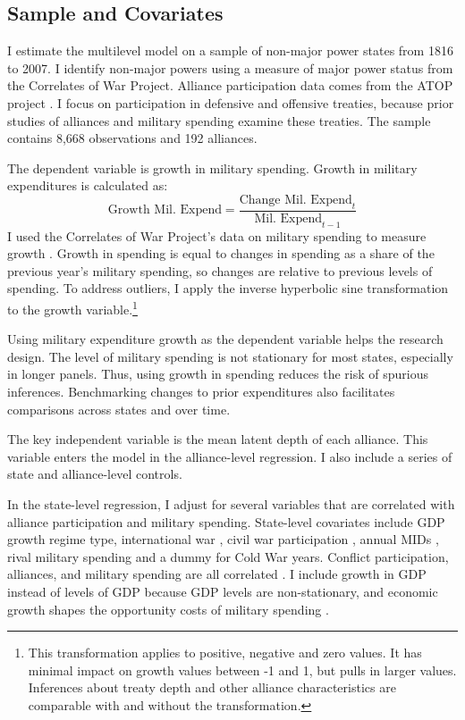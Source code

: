 \documentclass[12pt]{article}
\begin{document}
\subsection{Sample and Covariates} 

I estimate the multilevel model on a sample of non-major power states from 1816 to 2007. 
I identify non-major powers using a measure of major power status from the Correlates of War Project. 
Alliance participation data comes from the ATOP project \citep{Leedsetal2002}.  
I focus on participation in defensive and offensive treaties, because prior studies of alliances and military spending examine these treaties. 
The sample contains 8,668 observations and 192 alliances. 


The dependent variable is growth in military spending.
Growth in military expenditures is calculated as:
\begin{equation}
\mbox{Growth Mil. Expend} = \frac{ \mbox{Change Mil. Expend}_t }{ \mbox{Mil. Expend}_{t-1} }
\end{equation} 
I used the Correlates of War Project's data on military spending to measure growth \citep{SingerCINC1988}. 
Growth in spending is equal to changes in spending as a share of the previous year's military spending, so changes are relative to previous levels of spending. 
To address outliers, I apply the inverse hyperbolic sine transformation to the growth variable.\footnote{This transformation applies to positive, negative and zero values. It has minimal impact on growth values between -1 and 1, but pulls in larger values. Inferences about treaty depth and other alliance characteristics are comparable with and without the transformation.}


Using military expenditure growth as the dependent variable helps the research design. 
The level of military spending is not stationary for most states, especially in longer panels. 
Thus, using growth in spending reduces the risk of spurious inferences.
Benchmarking changes to prior expenditures also facilitates comparisons across states and over time. 


The key independent variable is the mean latent depth of each alliance. 
This variable enters the model in the alliance-level regression. 
I also include a series of state and alliance-level controls. 


In the state-level regression, I adjust for several variables that are correlated with alliance participation and military spending. 
State-level covariates include GDP growth \citep{Boltetal2018} regime type, international war \cite{Reiteretal2016}, civil war participation \citep{SarkeesWayman2010}, annual MIDs \citep{Gibleretal2016}, rival military spending \citep{ThompsonDreyer2012} and a dummy for Cold War years.
Conflict participation, alliances, and military spending are all correlated \citep{SeneseVasquez2008}.
I include growth in GDP instead of levels of GDP because GDP levels are non-stationary, and economic growth shapes the opportunity costs of military spending \citep{Kimball2010, Zielinskietal2017}.  
\end{document}
